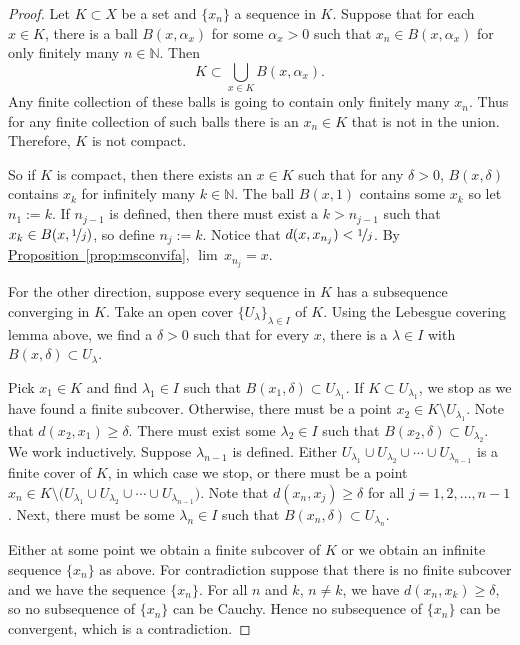 \documentclass[12pt]{book}
\newcommand{\N}{{\mathbb{N}}}
\theoremstyle{plain}
\theoremstyle{remark}
\theoremstyle{definition}
\theoremstyle{exercise}
\theoremstyle{example}
\newcommand{\propref}[1]{\hyperref[#1]{Proposition~\ref*{#1}}}
\begin{document}
\begin{proof}
Let $K \subset X$ be a set and
$\{ x_n \}$ a sequence in $K$.  Suppose that for each $x \in K$,
there is a ball $B(x,\alpha_x)$ for some $\alpha_x > 0$ such that
$x_n \in B(x,\alpha_x)$ for only finitely many $n \in \N$.
Then
\begin{equation*}
K \subset \bigcup_{x \in K} B(x,\alpha_x) .
\end{equation*}
Any finite collection of these balls is going to contain only finitely many
$x_n$.  Thus for any finite collection of such balls there is an $x_n \in K$
that is not in the union.  Therefore, $K$ is not compact.

So if $K$ is compact,
then there exists an $x \in K$ such that
for any $\delta > 0$,
$B(x,\delta)$ contains $x_k$ for infinitely many $k \in \N$.
The ball $B(x,1)$ contains some $x_k$ so let $n_1 := k$.
If $n_{j-1}$ is defined, then there must
exist a $k > n_{j-1}$ such that $x_k \in B(x,\nicefrac{1}{j})$, so define
$n_j := k$.  Notice that
$d(x,x_{n_j}) < \nicefrac{1}{j}$.  By \propref{prop:msconvifa},
$\lim\, x_{n_j} = x$.

For the other direction, suppose every sequence in $K$
has a 
subsequence converging in $K$.
Take
an open cover $\{ U_\lambda \}_{\lambda \in I}$ of $K$.
Using the Lebesgue covering lemma above, we find a $\delta > 0$
such that for every $x$, there is a $\lambda \in I$ with
$B(x,\delta) \subset U_\lambda$.

Pick $x_1 \in K$ and find $\lambda_1 \in I$ such that $B(x_1,\delta) \subset
U_{\lambda_1}$.
If $K \subset U_{\lambda_1}$, we stop as we have found a
finite subcover.
Otherwise, there must be
a point $x_2 \in K \setminus U_{\lambda_1}$.
Note that $d(x_2,x_1) \geq \delta$.
There must exist some $\lambda_2 \in I$ such that
$B(x_2,\delta) \subset U_{\lambda_2}$.
We work inductively.  Suppose $\lambda_{n-1}$ is defined.
Either
$U_{\lambda_1} \cup
U_{\lambda_2} \cup \cdots \cup
U_{\lambda_{n-1}}$ is a finite cover of $K$, in which case we
stop, or
there must be 
a point $x_n \in K \setminus \bigl( U_{\lambda_1} \cup
U_{\lambda_2} \cup \cdots \cup
U_{\lambda_{n-1}}\bigr)$.
Note that $d(x_n,x_j) \geq \delta$ for all $j = 1,2,\ldots,n-1$.
Next, there must be some $\lambda_n \in I$
such that $B(x_n,\delta) \subset U_{\lambda_n}$.

Either at some point we obtain a finite subcover of $K$
or we obtain an
infinite
sequence $\{ x_n \}$ as above.
For contradiction suppose that
there is no finite subcover and we have the sequence $\{ x_n \}$.
For all $n$ and $k$, $n \not= k$, 
we have $d(x_n,x_k) \geq \delta$,
so no subsequence of $\{ x_n \}$ can be
Cauchy.  Hence no subsequence of $\{ x_n \}$ can be convergent,
which is a contradiction.
\end{proof}
\end{document}
